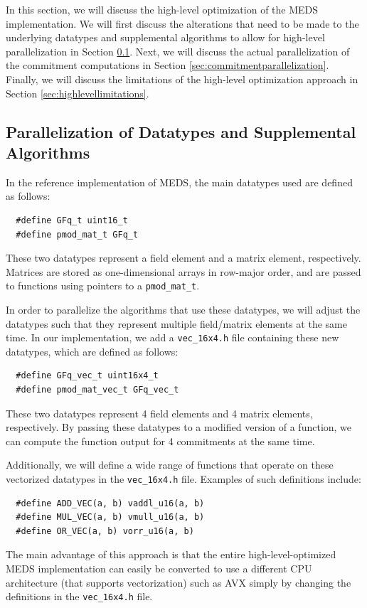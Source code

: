 \documentclass[11pt,a4paper]{report}
\theoremstyle{definition}
\begin{document}
In this section, we will discuss the high-level optimization of the MEDS implementation. We will first discuss the alterations that need to be made to the underlying datatypes and supplemental algorithms to allow for high-level parallelization in Section \ref{sec:highleveldataalgorithms}. Next, we will discuss the actual parallelization of the commitment computations in Section \ref{sec:commitmentparallelization}. Finally, we will discuss the limitations of the high-level optimization approach in Section \ref{sec:highlevellimitations}.

\subsection{Parallelization of Datatypes and Supplemental Algorithms}
\label{sec:highleveldataalgorithms}
In the reference implementation of MEDS, the main datatypes used are defined as follows:
\begin{verbatim}
  #define GFq_t uint16_t
  #define pmod_mat_t GFq_t
\end{verbatim}
These two datatypes represent a field element and a matrix element, respectively. Matrices are stored as one-dimensional arrays in row-major order, and are passed to functions using pointers to a \texttt{pmod\_mat\_t}.

In order to parallelize the algorithms that use these datatypes, we will adjust the datatypes such that they represent multiple field/matrix elements at the same time. In our implementation, we add a \texttt{vec\_16x4.h} file containing these new datatypes, which are defined as follows:
\begin{verbatim}
  #define GFq_vec_t uint16x4_t
  #define pmod_mat_vec_t GFq_vec_t
\end{verbatim}
These two datatypes represent 4 field elements and 4 matrix elements, respectively. By passing these datatypes to a modified version of a function, we can compute the function output for 4 commitments at the same time.

Additionally, we will define a wide range of functions that operate on these vectorized datatypes in the \texttt{vec\_16x4.h} file. Examples of such definitions include:
\begin{verbatim}
  #define ADD_VEC(a, b) vaddl_u16(a, b)
  #define MUL_VEC(a, b) vmull_u16(a, b)
  #define OR_VEC(a, b) vorr_u16(a, b)
\end{verbatim}
The main advantage of this approach is that the entire high-level-optimized MEDS implementation can easily be converted to use a different CPU architecture (that supports vectorization) such as AVX simply by changing the definitions in the \texttt{vec\_16x4.h} file.
\end{document}
